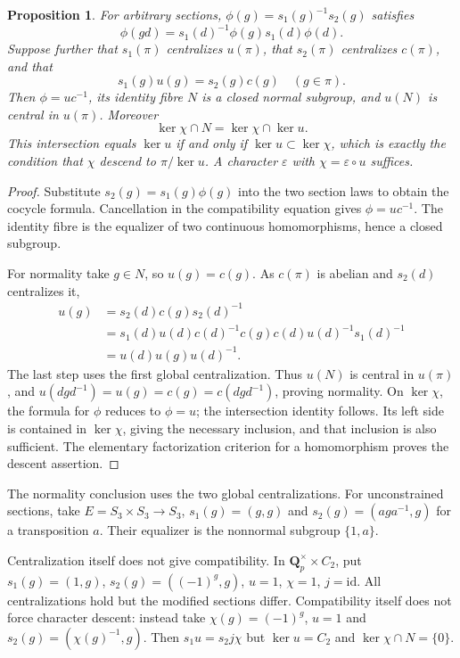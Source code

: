 \documentclass[11pt]{article}
\newtheorem{proposition}[theorem]{Proposition}
\theoremstyle{definition}\newtheorem{definition}[theorem]{Definition}
\theoremstyle{remark}\newtheorem{remark}[theorem]{Remark}
\newcommand{\Q}{\mathbf Q}\newcommand{\Z}{\mathbf Z}
\begin{document}
\begin{proposition}\label{prop:normal-equalizer}
For arbitrary sections, $\phi(g)=s_1(g)^{-1}s_2(g)$ satisfies
\[
 \phi(gd)=s_1(d)^{-1}\phi(g)s_1(d)\phi(d).
\]
Suppose further that $s_1(\pi)$ centralizes $u(\pi)$, that $s_2(\pi)$ centralizes $c(\pi)$, and that
\[
                       s_1(g)u(g)=s_2(g)c(g)\quad(g\in\pi).
\]
Then $\phi=u c^{-1}$, its identity fibre $N$ is a closed normal subgroup, and $u(N)$ is central in $u(\pi)$. Moreover
\[
 \ker\chi\cap N=\ker\chi\cap\ker u.
\]
This intersection equals $\ker u$ if and only if $\ker u\subset\ker\chi$, which is exactly the condition that $\chi$ descend to $\pi/\ker u$. A character $\varepsilon$ with $\chi=\varepsilon\circ u$ suffices.
\end{proposition}
\begin{proof}
Substitute $s_2(g)=s_1(g)\phi(g)$ into the two section laws to obtain the cocycle formula. Cancellation in the compatibility equation gives $\phi=u c^{-1}$. The identity fibre is the equalizer of two continuous homomorphisms, hence a closed subgroup.

For normality take $g\in N$, so $u(g)=c(g)$. As $c(\pi)$ is abelian and $s_2(d)$ centralizes it,
\[
 \begin{aligned}
 u(g)&=s_2(d)c(g)s_2(d)^{-1}\\
 &=s_1(d)u(d)c(d)^{-1}c(g)c(d)u(d)^{-1}s_1(d)^{-1}\\
 &=u(d)u(g)u(d)^{-1}.
 \end{aligned}
\]
The last step uses the first global centralization. Thus $u(N)$ is central in $u(\pi)$, and $u(dgd^{-1})=u(g)=c(g)=c(dgd^{-1})$, proving normality. On $\ker\chi$, the formula for $\phi$ reduces to $\phi=u$; the intersection identity follows. Its left side is contained in $\ker\chi$, giving the necessary inclusion, and that inclusion is also sufficient. The elementary factorization criterion for a homomorphism proves the descent assertion.
\end{proof}

The normality conclusion uses the two global centralizations. For unconstrained sections, take $E=S_3\times S_3\to S_3$, $s_1(g)=(g,g)$ and $s_2(g)=(aga^{-1},g)$ for a transposition $a$. Their equalizer is the nonnormal subgroup $\{1,a\}$.

Centralization itself does not give compatibility. In $\Q_p^\times\times C_2$, put $s_1(g)=(1,g)$, $s_2(g)=((-1)^g,g)$, $u=1$, $\chi=1$, $j=\mathrm{id}$. All centralizations hold but the modified sections differ. Compatibility itself does not force character descent: instead take $\chi(g)=(-1)^g$, $u=1$ and $s_2(g)=(\chi(g)^{-1},g)$. Then $s_1u=s_2j\chi$ but $\ker u=C_2$ and $\ker\chi\cap N=\{0\}$.
\end{document}
